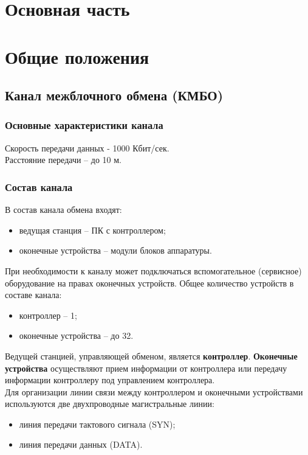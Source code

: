 \section*{Основная часть}
\section{Общие положения}
	\subsection{Канал межблочного обмена (КМБО)}
		\subsubsection{Основные характеристики канала}
		Скорость передачи данных - 1000 Кбит/сек.\\
		
		Расстояние передачи – до 10 м.
		
		\subsubsection{Состав канала}
		В состав канала обмена входят:
		\begin{itemize}
			\item ведущая станция – ПК с контроллером;
			\item оконечные устройства – модули блоков аппаратуры. \\
		\end{itemize}
	
		При необходимости к каналу может подключаться вспомогательное (сервисное) оборудование на правах оконечных устройств.
		Общее количество устройств в составе канала:
		\begin{itemize}
			\item контроллер – 1;
			\item оконечные устройства – до 32. \\
		\end{itemize}
	
		Ведущей станцией, управляющей обменом, является \textbf{контроллер}. \textbf{Оконечные устройства} осуществляют прием информации от контроллера или передачу информации контроллеру под управлением контроллера. \\
		
		Для организации линии связи между контроллером и оконечными устройствами используются две двухпроводные магистральные линии:
		\begin{itemize}
			\item линия передачи тактового сигнала (SYN); 
			\item линия передачи данных (DATA). \\
		\end{itemize}	
	
